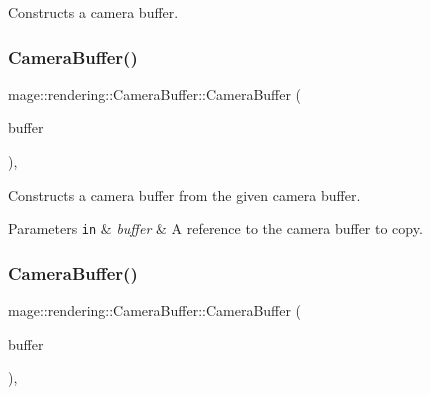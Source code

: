 Constructs a camera buffer. \hypertarget{structmage_1_1rendering_1_1_camera_buffer_a08ff60a4695d723218c5cffb4b95cc59}{}\label{structmage_1_1rendering_1_1_camera_buffer_a08ff60a4695d723218c5cffb4b95cc59} 
\subsubsection{\texorpdfstring{Camera\+Buffer()}{CameraBuffer()}\hspace{0.1cm}{\footnotesize\ttfamily [2/3]}}
{\footnotesize\ttfamily mage\+::rendering\+::\+Camera\+Buffer\+::\+Camera\+Buffer (\begin{DoxyParamCaption}\item[{const \hyperlink{structmage_1_1rendering_1_1_camera_buffer}{Camera\+Buffer} \&}]{buffer }\end{DoxyParamCaption})\hspace{0.3cm}{\ttfamily [default]}, {\ttfamily [noexcept]}}

Constructs a camera buffer from the given camera buffer.


\begin{DoxyParams}[1]{Parameters}
\mbox{\tt in}  & {\em buffer} & A reference to the camera buffer to copy. \\
\hline
\end{DoxyParams}
\hypertarget{structmage_1_1rendering_1_1_camera_buffer_a16f0d0938bb4e4174461c3a8c8ad3e20}{}\label{structmage_1_1rendering_1_1_camera_buffer_a16f0d0938bb4e4174461c3a8c8ad3e20} 
\subsubsection{\texorpdfstring{Camera\+Buffer()}{CameraBuffer()}\hspace{0.1cm}{\footnotesize\ttfamily [3/3]}}
{\footnotesize\ttfamily mage\+::rendering\+::\+Camera\+Buffer\+::\+Camera\+Buffer (\begin{DoxyParamCaption}\item[{\hyperlink{structmage_1_1rendering_1_1_camera_buffer}{Camera\+Buffer} \&\&}]{buffer }\end{DoxyParamCaption})\hspace{0.3cm}{\ttfamily [default]}, {\ttfamily [noexcept]}}


